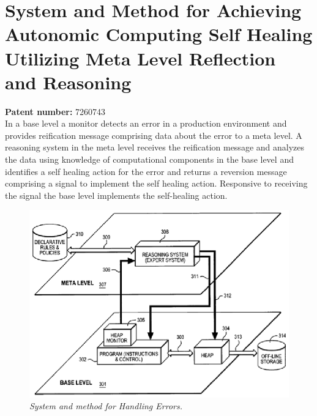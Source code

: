 \section{System and Method for Achieving Autonomic Computing Self Healing Utilizing Meta Level Reflection and Reasoning}
\textbf{Patent number:}  7260743\cite{FELLENSTEIN:2007}\\
In a base level a monitor detects an error in a production environment and provides reification message comprising data about the error to a meta level. A reasoning system in the meta level receives the reification message and analyzes the data using knowledge of computational components in the base level and identifies a self healing action for the error and returns a reversion message comprising a signal to implement the self healing action. Responsive to receiving the signal the base level implements the self-healing action.
	\begin{figure}[h]
		\begin{center}
			\includegraphics{figures/patent3.eps} 
			\caption{\small \sl System and method for Handling Errors.\label{fig:Label5}} 
		\end{center} 
	\end{figure}
